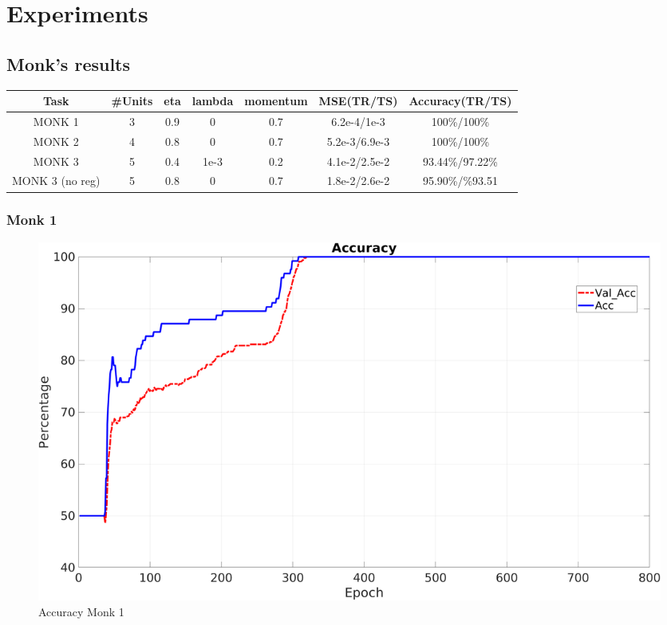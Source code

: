 \section{Experiments}

\subsection{Monk's results}
\begin{table}[H]
\begin{tabular}{|c|c|c|c|c|c|c|}
\hline
\textbf{Task} &	\textbf{\#Units} &\textbf{ eta} & \textbf{lambda} &\textbf{momentum} & {\textbf{MSE(TR/TS)}} &\textbf{Accuracy(TR/TS)} \\ \hline
MONK 1        &    3 & 0.9 & 0 & 0.7  &   6.2e-4/1e-3 &   100\%/100\%  \\ \hline
MONK 2        &    4 & 0.8 & 0 & 0.7  &   5.2e-3/6.9e-3 &   100\%/100\% \\ \hline               
MONK 3        &    5 & 0.4 &1e-3 &0.2&     4.1e-2/2.5e-2&    93.44\%/97.22\%  \\ \hline
MONK 3 (no reg)&   5 & 0.8 &   0 &  0.7 &   1.8e-2/2.6e-2 & 95.90\%/\%93.51		\\ \hline              
\end{tabular}
\end{table}
\subsubsection{Monk 1}
\begin{figure}[H]
\includegraphics[scale=0.2]{img/Monk1_accuracy.png}
\caption{Accuracy Monk 1}
\end{figure}

